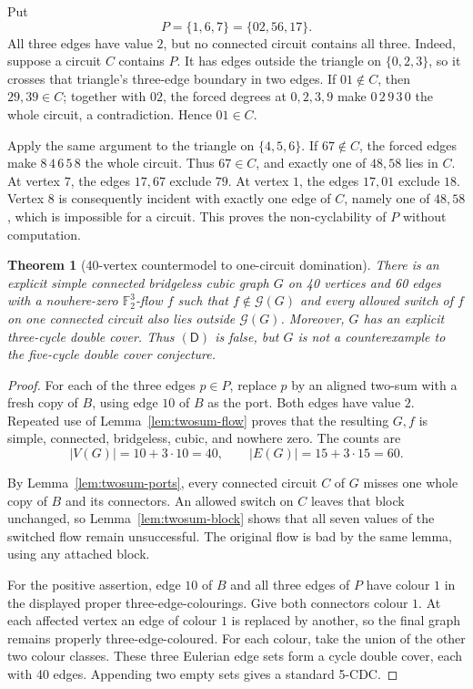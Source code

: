 \documentclass[11pt]{article}
\newtheorem{theorem}{Theorem}[section]
\theoremstyle{definition}
\theoremstyle{remark}
\newcommand{\F}{\mathbb F}
\newcommand{\Good}{\mathcal G}
\begin{document}
Put
\[
 P=\{1,6,7\}=\{02,56,17\}.                                      \tag{16}
\]
All three edges have value \(2\), but no connected circuit contains all
three.  Indeed, suppose a circuit \(C\) contains \(P\).  It has edges
outside the triangle on \(\{0,2,3\}\), so it crosses that triangle's
three-edge boundary in two edges.  If \(01\notin C\), then \(29,39\in C\);
together with \(02\), the forced degrees at \(0,2,3,9\) make
\(0\,2\,9\,3\,0\) the whole circuit, a contradiction.  Hence
\(01\in C\).

Apply the same argument to the triangle on \(\{4,5,6\}\).  If
\(67\notin C\), the forced edges make \(8\,4\,6\,5\,8\) the whole
circuit.  Thus \(67\in C\), and exactly one of \(48,58\) lies in \(C\).
At vertex \(7\), the edges \(17,67\) exclude \(79\).  At vertex \(1\),
the edges \(17,01\) exclude \(18\).  Vertex \(8\) is consequently
incident with exactly one edge of \(C\), namely one of \(48,58\), which
is impossible for a circuit.  This proves the non-cyclability of \(P\)
without computation.

\begin{theorem}[40-vertex countermodel to one-circuit domination]
\label{thm:maincountermodel}
There is an explicit simple connected bridgeless cubic graph \(G\) on
40 vertices and 60 edges with a nowhere-zero \(\F_2^3\)-flow \(f\) such
that \(f\notin\Good(G)\) and every allowed switch of \(f\) on one
connected circuit also lies outside \(\Good(G)\).  Moreover, \(G\) has
an explicit three-cycle double cover.  Thus \((\mathsf D)\) is false,
but \(G\) is not a counterexample to the five-cycle double cover
conjecture.
\end{theorem}

\begin{proof}
For each of the three edges \(p\in P\), replace \(p\) by an aligned
two-sum with a fresh copy of \(B\), using edge \(10\) of \(B\) as the
port.  Both edges have value \(2\).  Repeated use of
Lemma~\ref{lem:twosum-flow} proves that the resulting \(G,f\) is simple,
connected, bridgeless, cubic, and nowhere zero.  The counts are
\[
 |V(G)|=10+3\cdot10=40,\qquad |E(G)|=15+3\cdot15=60.
\]

By Lemma~\ref{lem:twosum-ports}, every connected circuit \(C\) of \(G\)
misses one whole copy of \(B\) and its connectors.  An allowed switch on
\(C\) leaves that block unchanged, so Lemma~\ref{lem:twosum-block}
shows that all seven values of the switched flow remain unsuccessful.
The original flow is bad by the same lemma, using any attached block.

For the positive assertion, edge \(10\) of \(B\) and all three edges of
\(P\) have colour \(1\) in the displayed proper three-edge-colourings.
Give both connectors colour \(1\).  At each affected vertex an edge of
colour \(1\) is replaced by another, so the final graph remains properly
three-edge-coloured.  For each colour, take the union of the other two
colour classes.  These three Eulerian edge sets form a cycle double
cover, each with 40 edges.  Appending two empty sets gives a standard
5-CDC.
\end{proof}
\end{document}
